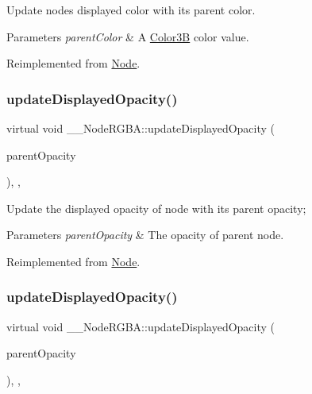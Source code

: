 Update node\textquotesingle{}s displayed color with its parent color. 
\begin{DoxyParams}{Parameters}
{\em parent\+Color} & A \hyperlink{structColor3B}{Color3B} color value. \\
\hline
\end{DoxyParams}


Reimplemented from \hyperlink{classNode_ac733bae7b9590f8da746cbc3d1337a2f}{Node}.

\mbox{\label{class____NodeRGBA_a428c41148bb3d1fe27d7eac80bb6df59}} 
\subsubsection{\texorpdfstring{update\+Displayed\+Opacity()}{updateDisplayedOpacity()}\hspace{0.1cm}{\footnotesize\ttfamily [1/2]}}
{\footnotesize\ttfamily virtual void \+\_\+\+\_\+\+Node\+R\+G\+B\+A\+::update\+Displayed\+Opacity (\begin{DoxyParamCaption}\item[{G\+Lubyte}]{parent\+Opacity }\end{DoxyParamCaption})\hspace{0.3cm}{\ttfamily [inline]}, {\ttfamily [override]}, {\ttfamily [virtual]}}

Update the displayed opacity of node with it\textquotesingle{}s parent opacity; 
\begin{DoxyParams}{Parameters}
{\em parent\+Opacity} & The opacity of parent node. \\
\hline
\end{DoxyParams}


Reimplemented from \hyperlink{classNode_a3a0122884e7e1ce310b8b68abfbb245b}{Node}.

\mbox{\label{class____NodeRGBA_a428c41148bb3d1fe27d7eac80bb6df59}} 
\subsubsection{\texorpdfstring{update\+Displayed\+Opacity()}{updateDisplayedOpacity()}\hspace{0.1cm}{\footnotesize\ttfamily [2/2]}}
{\footnotesize\ttfamily virtual void \+\_\+\+\_\+\+Node\+R\+G\+B\+A\+::update\+Displayed\+Opacity (\begin{DoxyParamCaption}\item[{G\+Lubyte}]{parent\+Opacity }\end{DoxyParamCaption})\hspace{0.3cm}{\ttfamily [inline]}, {\ttfamily [override]}, {\ttfamily [virtual]}}

